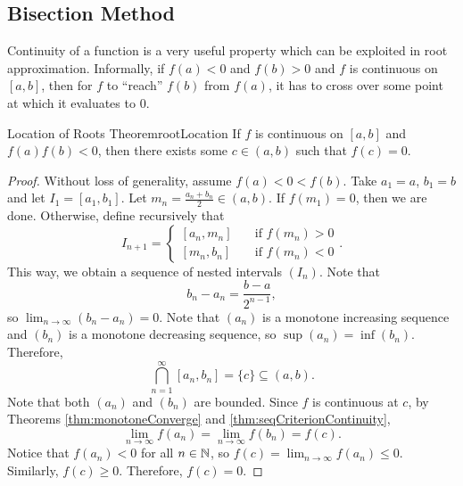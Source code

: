 \documentclass[math]{amznotes}
\theoremstyle{remark}
\begin{document}
\subsection{Bisection Method}
Continuity of a function is a very useful property which can be exploited in root approximation. Informally, if $f(a) < 0$ and $f(b) > 0$ and $f$ is continuous on $[a, b]$, then for $f$ to ``reach'' $f(b)$ from $f(a)$, it has to cross over some point at which it evaluates to $0$.
\begin{thmbox}{Location of Roots Theorem}{rootLocation}
    If $f$ is continuous on $[a, b]$ and $f(a)f(b) < 0$, then there exists some $c \in (a, b)$ such that $f(c) = 0$.
    \tcblower
    \begin{proof}
        Without loss of generality, assume $f(a) < 0 < f(b)$. Take $a_1 = a$, $b_1 = b$ and let $I_1 = [a_1, b_1]$. Let $m_n = \frac{a_n + b_n}{2} \in (a, b)$. If $f(m_1) = 0$, then we are done. Otherwise, define recursively that
        \begin{equation*}
            I_{n + 1} = \begin{cases}
                [a_n, m_n] & \quad\textrm{if } f(m_n) > 0 \\
                [m_n, b_n] & \quad\textrm{if } f(m_n) < 0
            \end{cases}.
        \end{equation*}
        This way, we obtain a sequence of nested intervals $(I_n)$. Note that
        \begin{equation*}
            b_n - a_n = \frac{b - a}{2^{n - 1}},
        \end{equation*}
        so $\lim_{n \to \infty}(b_n - a_n) = 0$. Note that $(a_n)$ is a monotone increasing sequence and $(b_n)$ is a monotone decreasing sequence, so $\sup(a_n) = \inf(b_n)$. Therefore,
        \begin{equation*}
            \bigcap_{n = 1}^{\infty}[a_n, b_n] = \{c\} \subseteq (a, b).
        \end{equation*}
        Note that both $(a_n)$ and $(b_n)$ are bounded. Since $f$ is continuous at $c$, by Theorems \ref{thm:monotoneConverge} and \ref{thm:seqCriterionContinuity},
        \begin{equation*}
            \lim_{n \to \infty}f(a_n) = \lim_{n \to \infty}f(b_n) = f(c).
        \end{equation*}
        Notice that $f(a_n) < 0$ for all $n \in \mathbb{N}$, so $f(c) = \lim_{n \to \infty}f(a_n) \leq 0$. Similarly, $f(c) \geq 0$. Therefore, $f(c) = 0$.
    \end{proof}
\end{thmbox}
\end{document}
